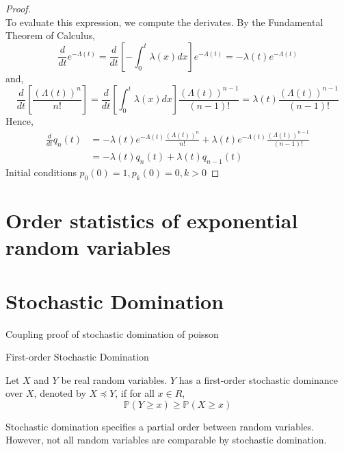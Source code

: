 \begin{proof}
$$	$$
	To evaluate this expression, we compute the derivates. By the Fundamental Theorem of Calculus,
	$$
		\frac{d}{dt} e^{-\Lambda (t)} 
		= \frac{d}{dt} \left[ - \int_0^t \lambda(x) dx \right] e^{-\Lambda (t)} 
		= - \lambda(t)  e^{-\Lambda (t)}
	$$
	and, 
	$$
		\frac{d}{dt} \left[ \frac{(\Lambda(t))^n}{n!} \right] 
		= \frac{d}{dt} \left[ \int_0^t \lambda(x) dx \right] \frac{(\Lambda(t))^{n-1}}{(n-1)!}
		= \lambda(t) \frac{(\Lambda(t))^{n-1}}{(n-1)!}
	$$
	Hence,
	\begin{align*}
		\frac{d}{dt} q_n(t) 
		&= - \lambda(t) e^{-\Lambda (t)} \frac{(\Lambda(t))^n}{n!} + \lambda(t) e^{-\Lambda (t)} \frac{(\Lambda(t))^{n-1}}{(n-1)!} \\
		&= -\lambda(t)q_n(t) + \lambda(t)q_{n-1}(t)
	\end{align*}
	Initial conditions
	$
		p_0(0) = 1, p_k(0) = 0, k > 0 
	$
\end{proof}



\section{Order statistics of exponential random variables}



\section{Stochastic Domination}
Coupling proof of stochastic domination of poisson 



\begin{definition}
	First-order Stochastic Domination

	\noindent
	Let $X$ and $Y$ be real random variables. $Y$ has a first-order stochastic dominance over $X$, denoted by $X \preceq Y$, if for all $x \in R$, 
	$$
		\mathbb{P}(Y \geq x) \geq \mathbb{P}(X \geq x)
	$$
\end{definition}

Stochastic domination specifies a partial order between random variables. However, not all random variables are comparable by stochastic domination. %


